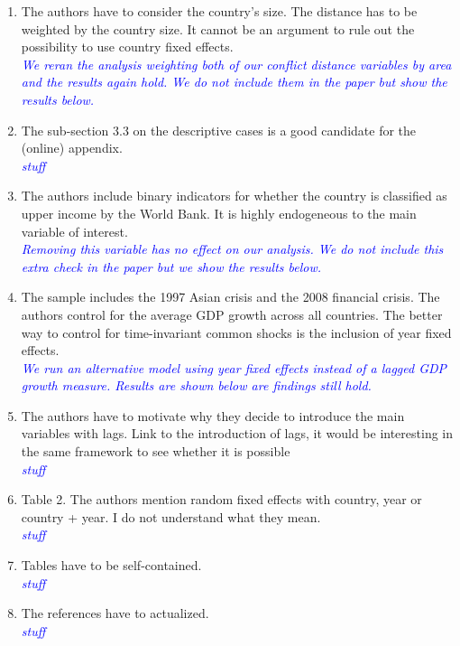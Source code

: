 \begin{enumerate}
\item The authors have to consider the country’s size. The distance has to be weighted by the country size. It cannot be an argument to rule out the possibility to use country fixed effects. \\

\textcolor{blue}{\emph{
	We reran the analysis weighting both of our conflict distance variables by area and the results again hold. We do not include them in the paper but show the results below. 
}}

\item The sub-section 3.3 on the descriptive cases is a good candidate for the (online) appendix. \\

\textcolor{blue}{\emph{
	stuff
}}

\item  The authors include binary indicators for whether the country is classified as upper income by the World Bank. It is highly endogeneous to the main variable of interest. \\

\textcolor{blue}{\emph{
	Removing this variable has no effect on our analysis. We do not include this extra check in the paper but we show the results below.
}}

\item The sample includes the 1997 Asian crisis and the 2008 financial crisis. The authors control for the average GDP growth across all countries. The better way to control for time-invariant common shocks is the inclusion of year fixed effects. \\

\textcolor{blue}{\emph{
	We run an alternative model using year fixed effects instead of a lagged GDP growth measure. Results are shown below are findings still hold.
}}

\item The authors have to motivate why they decide to introduce the main variables with lags. Link to the introduction of lags, it would be interesting in the same framework to see whether it is possible \\

\textcolor{blue}{\emph{
	stuff
}}

\item Table 2. The authors mention random fixed effects with country, year or country + year. I do not understand what they mean. \\

\textcolor{blue}{\emph{
	stuff
}}

\item Tables have to be self-contained. \\

\textcolor{blue}{\emph{
	stuff
}}

\item The references have to actualized. \\

\textcolor{blue}{\emph{
	stuff
}}

\end{enumerate}